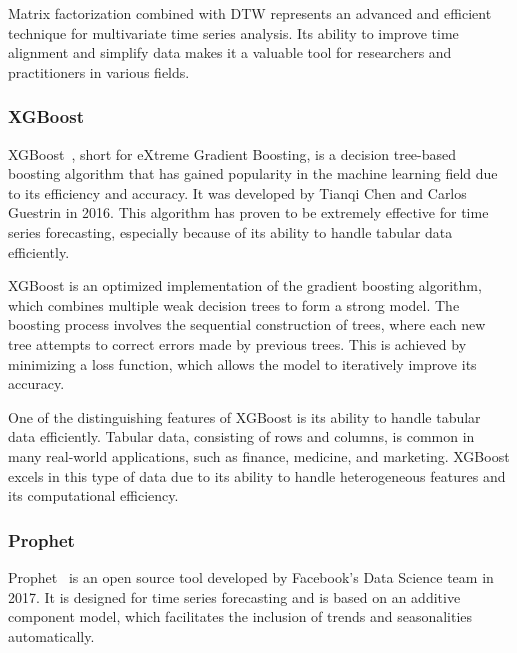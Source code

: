 Matrix factorization combined with DTW represents an advanced and efficient technique for multivariate time series analysis. Its ability to improve time alignment and simplify data makes it a valuable tool for researchers and practitioners in various fields.
\vspace{10pt}

\subsubsection{XGBoost}
XGBoost~\cite{Chen_2016}, short for eXtreme Gradient Boosting, is a decision tree-based boosting algorithm that has gained popularity in the machine learning field due to its efficiency and accuracy. It was developed by Tianqi Chen and Carlos Guestrin in 2016. This algorithm has proven to be extremely effective for time series forecasting, especially because of its ability to handle tabular data efficiently.

XGBoost is an optimized implementation of the gradient boosting algorithm, which combines multiple weak decision trees to form a strong model. The boosting process involves the sequential construction of trees, where each new tree attempts to correct errors made by previous trees. This is achieved by minimizing a loss function, which allows the model to iteratively improve its accuracy.

One of the distinguishing features of XGBoost is its ability to handle tabular data efficiently. Tabular data, consisting of rows and columns, is common in many real-world applications, such as finance, medicine, and marketing. XGBoost excels in this type of data due to its ability to handle heterogeneous features and its computational efficiency.
\vspace{10pt}

\subsubsection{Prophet}
Prophet~\cite{prophet} is an open source tool developed by Facebook's Data Science team in 2017. It is designed for time series forecasting and is based on an additive component model, which facilitates the inclusion of trends and seasonalities automatically.

